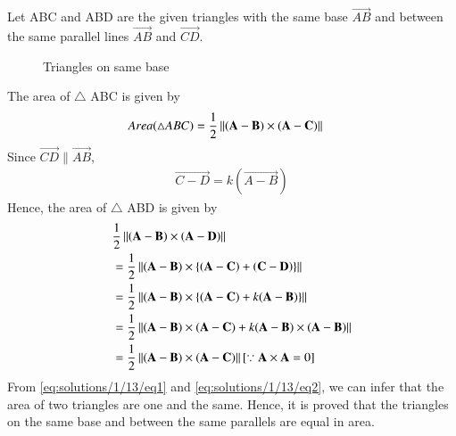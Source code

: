 Let ABC and ABD are the given triangles with the same base $\vec{AB}$ and between the same parallel lines $\vec{AB}$ and $\vec{CD}$.
\renewcommand{\thefigure}{1}
\begin{figure}[!ht] \label{fig:two_triangles}
\centering
\resizebox{\columnwidth}{!}{}
\caption{Triangles on same base}
\end{figure}

The area of $\triangle$ ABC is given by
\begin{align} 
	  Area(\triangle ABC) &= \frac{1}{2}\left\lVert(\mathbf{A} - \mathbf{B}) \times (\mathbf{A} - \mathbf{C})\right\rVert\label{eq:solutions/1/13/eq1}
\end{align}
Since $\vec{CD} \parallel \vec{AB}$,
\begin{align}\label{eq:solutions/1/13/fact1} \vec{C-D} = k(\vec{A-B})\end{align}
Hence, the area of $\triangle$ ABD is given by
\begin{align}
&\frac{1}{2}\left\lVert\left(\mathbf{A}-\mathbf{B}\right) \times \left(\mathbf{A}-\mathbf{D}\right)\right\rVert\\ 
&=\frac{1}{2}\left\lVert(\mathbf{A}-\mathbf{B}) \times \left\{\left(\mathbf{A}-\mathbf{C}\right) + \left(\mathbf{C}-\mathbf{D}\right)\right\}\right\rVert\\
&=\frac{1}{2}\left\lVert(\mathbf{A}-\mathbf{B}) \times  \left\{(\mathbf{A}-\mathbf{C}) + k(\mathbf{A}-\mathbf{B})\right\}\right\rVert\\
&=\frac{1}{2}\left\lVert(\mathbf{A}-\mathbf{B})\times(\mathbf{A}-\mathbf{C})+k(\mathbf{A}-\mathbf{B})\times (\mathbf{A}-\mathbf{B})\right\rVert\\
&=\frac{1}{2}\left\lVert(\mathbf{A}-\mathbf{B})\times(\mathbf{A} - \mathbf{C})\right\rVert[\because \mathbf{A} \times \mathbf{A} =0] \label{eq:solutions/1/13/eq2}
\end{align}
From \eqref{eq:solutions/1/13/eq1} and \eqref{eq:solutions/1/13/eq2}, we can infer that the area of two triangles are one and the same.
Hence, it is proved that the triangles on the same base and between the same parallels are equal in area.
